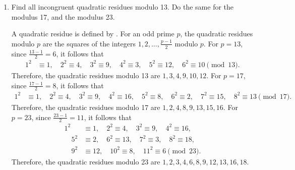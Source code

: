 \begin{enumerate}
  \item Find all incongruent quadratic residues modulo 13. Do the same for the modulus 17, and the modulus 23.
  \begin{subanswer}
    A quadratic residue is defined by . 
    For an odd prime $p$, the quadratic residues modulo $p$ are the squares of the integers $1, 2, \ldots, \frac{p-1}{2}$ modulo $p$.
    For $p = 13$, since $\frac{13-1}{2} = 6$, it follows that
    \begin{align*}
      1^2 &\equiv 1, \quad 2^2 \equiv 4, \quad 3^2 \equiv 9, \quad 4^2 \equiv 3, \quad 5^2 \equiv 12, \quad 6^2 \equiv 10 \pmod{13}.
    \end{align*}
    Therefore, the quadratic residues modulo 13 are $1, 3, 4, 9, 10, 12$.
    For $p = 17$, since $\frac{17-1}{2} = 8$, it follows that
    \begin{align*}
      1^2 &\equiv 1, \quad 2^2 \equiv 4, \quad 3^2 \equiv 9, \quad 4^2 \equiv 16, \quad 5^2 \equiv 8, \quad 6^2 \equiv 2, \quad 7^2 \equiv 15, \quad 8^2 \equiv 13 \pmod{17}.
    \end{align*}
    Therefore, the quadratic residues modulo 17 are $1, 2, 4, 8, 9, 13, 15, 16$.
    For $p = 23$, since $\frac{23-1}{2} = 11$, it follows that
    \begin{align*}
      1^2 &\equiv 1, \quad 2^2 \equiv 4, \quad 3^2 \equiv 9, \quad 4^2 \equiv 16, \\
      \quad 5^2 &\equiv 2, \quad 6^2 \equiv 13, \quad 7^2 \equiv 3, \quad 8^2 \equiv 18, \\
      \quad 9^2 &\equiv 12, \quad 10^2 \equiv 8, \quad 11^2 \equiv 6 \pmod{23}.
    \end{align*}
    Therefore, the quadratic residues modulo 23 are $1, 2, 3, 4, 6, 8, 9, 12, 13, 16, 18$.
  \end{subanswer}
  

\end{enumerate}
